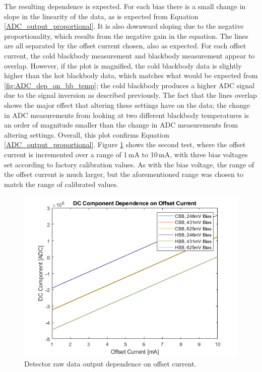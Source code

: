 The resulting dependence is expected. For each bias there is a small change in slope in the linearity of the data, as is expected from Equation \ref{ADC_output_proportional}. It is also downward sloping due to the negative proportionality, which results from the negative gain in the equation. The lines are all separated by the offset current chosen, also as expected. For each offset current, the cold blackbody measurement and blackbody measurement appear to overlap. However, if the plot is magnified, the cold blackbody data is slightly higher than the hot blackbody data, which matches what would be expected from \ref{fig:ADC_dep_on_bb_temp}; the cold blackbody produces a higher ADC signal due to the signal inversion as described previously. The fact that the lines overlap shows the major effect that altering these settings have on the data; the change in ADC measurements from looking at two different blackbody temperatures is an order of magnitude smaller than the change in ADC measurements from altering settings. Overall, this plot confirms Equation \ref{ADC_output_proportional}. Figure \ref{fig:dc_dep_on_offset} shows the second test, where the offset current is incremented over a range of 1\,mA to 10\,mA, with three bias voltages set according to factory calibration values. As with the bias voltage, the range of the offset current is much larger, but the aforementioned range was chosen to match the range of calibrated values.

\begin{figure}[h]
  \centering
  \includegraphics[width=0.9\linewidth]{chap6_images/verification/dc_component_dependence_on_offset_current.png}
  \caption{Detector raw data output dependence on offset current.}
  \label{fig:dc_dep_on_offset}
\end{figure}

